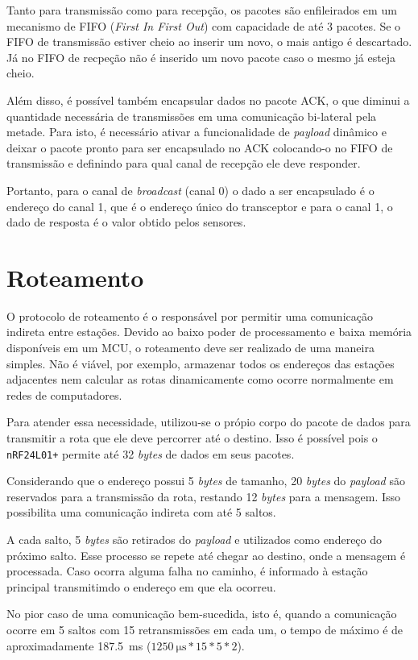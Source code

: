 {Tanto para transmissão como para recepção, os pacotes são enfileirados em um mecanismo de FIFO (\textit{First
In First Out}) com capacidade de até 3 pacotes. Se o FIFO de transmissão estiver cheio ao inserir um novo, o
mais antigo é descartado. Já no FIFO de recpeção não é inserido um novo pacote caso o mesmo já esteja cheio.

Além disso, é possível também encapsular dados no pacote ACK, o que diminui a quantidade necessária de
transmissões em uma comunicação bi-lateral pela metade. Para isto, é necessário ativar a funcionalidade de
\textit{payload} dinâmico e deixar o pacote pronto para ser encapsulado no ACK colocando-o no FIFO de
transmissão e definindo para qual canal de recepção ele deve responder.

Portanto, para o canal de \textit{broadcast} (canal 0) o dado a ser encapsulado é o endereço do canal 1, que é o
endereço único do transceptor e para o canal 1, o dado de resposta é o valor obtido pelos sensores.

\section{Roteamento}
O protocolo de roteamento é o responsável por permitir uma comunicação indireta entre estações. Devido ao
baixo poder de processamento e baixa memória disponíveis em um MCU, o roteamento deve ser realizado de uma
maneira simples. Não é viável, por exemplo, armazenar todos os endereços das estações adjacentes nem
calcular as rotas dinamicamente como ocorre normalmente em redes de computadores.

Para atender essa necessidade, utilizou-se o própio corpo do pacote de dados para transmitir a rota
que ele deve percorrer até o destino. Isso é possível pois o \texttt{nRF24L01+} permite até 32
\textit{bytes} de dados em seus pacotes.

Considerando que o endereço possui 5 \textit{bytes} de tamanho, 20 \textit{bytes} do \textit{payload} são
reservados para a transmissão da rota, restando 12 \textit{bytes} para a mensagem. Isso possibilita uma
comunicação indireta com até 5 saltos.

A cada salto, 5 \textit{bytes} são retirados do \textit{payload} e utilizados como endereço do próximo salto.
Esse processo se repete até chegar ao destino, onde a mensagem é processada. Caso ocorra alguma falha no
caminho, é informado à estação principal transmitimdo o endereço em que ela ocorreu.

No pior caso de uma comunicação bem-sucedida, isto é, quando a comunicação ocorre em 5 saltos com 15
retransmissões em cada um, o tempo de máximo é de aproximadamente \SI{187.5}{\milli \second}
($\SI{1250}{\micro \second} * 15 * 5 * 2$).

}
